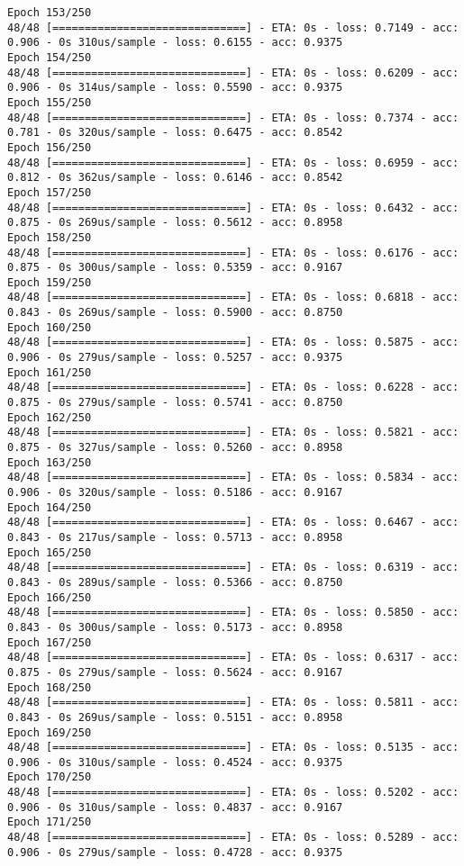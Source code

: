 \documentclass[11pt]{article}
\begin{document}
\begin{Verbatim}[commandchars=\\\{\}]
Epoch 153/250
48/48 [==============================] - ETA: 0s - loss: 0.7149 - acc: 0.906 - 0s 310us/sample - loss: 0.6155 - acc: 0.9375
Epoch 154/250
48/48 [==============================] - ETA: 0s - loss: 0.6209 - acc: 0.906 - 0s 314us/sample - loss: 0.5590 - acc: 0.9375
Epoch 155/250
48/48 [==============================] - ETA: 0s - loss: 0.7374 - acc: 0.781 - 0s 320us/sample - loss: 0.6475 - acc: 0.8542
Epoch 156/250
48/48 [==============================] - ETA: 0s - loss: 0.6959 - acc: 0.812 - 0s 362us/sample - loss: 0.6146 - acc: 0.8542
Epoch 157/250
48/48 [==============================] - ETA: 0s - loss: 0.6432 - acc: 0.875 - 0s 269us/sample - loss: 0.5612 - acc: 0.8958
Epoch 158/250
48/48 [==============================] - ETA: 0s - loss: 0.6176 - acc: 0.875 - 0s 300us/sample - loss: 0.5359 - acc: 0.9167
Epoch 159/250
48/48 [==============================] - ETA: 0s - loss: 0.6818 - acc: 0.843 - 0s 269us/sample - loss: 0.5900 - acc: 0.8750
Epoch 160/250
48/48 [==============================] - ETA: 0s - loss: 0.5875 - acc: 0.906 - 0s 279us/sample - loss: 0.5257 - acc: 0.9375
Epoch 161/250
48/48 [==============================] - ETA: 0s - loss: 0.6228 - acc: 0.875 - 0s 279us/sample - loss: 0.5741 - acc: 0.8750
Epoch 162/250
48/48 [==============================] - ETA: 0s - loss: 0.5821 - acc: 0.875 - 0s 327us/sample - loss: 0.5260 - acc: 0.8958
Epoch 163/250
48/48 [==============================] - ETA: 0s - loss: 0.5834 - acc: 0.906 - 0s 320us/sample - loss: 0.5186 - acc: 0.9167
Epoch 164/250
48/48 [==============================] - ETA: 0s - loss: 0.6467 - acc: 0.843 - 0s 217us/sample - loss: 0.5713 - acc: 0.8958
Epoch 165/250
48/48 [==============================] - ETA: 0s - loss: 0.6319 - acc: 0.843 - 0s 289us/sample - loss: 0.5366 - acc: 0.8750
Epoch 166/250
48/48 [==============================] - ETA: 0s - loss: 0.5850 - acc: 0.843 - 0s 300us/sample - loss: 0.5173 - acc: 0.8958
Epoch 167/250
48/48 [==============================] - ETA: 0s - loss: 0.6317 - acc: 0.875 - 0s 279us/sample - loss: 0.5624 - acc: 0.9167
Epoch 168/250
48/48 [==============================] - ETA: 0s - loss: 0.5811 - acc: 0.843 - 0s 269us/sample - loss: 0.5151 - acc: 0.8958
Epoch 169/250
48/48 [==============================] - ETA: 0s - loss: 0.5135 - acc: 0.906 - 0s 310us/sample - loss: 0.4524 - acc: 0.9375
Epoch 170/250
48/48 [==============================] - ETA: 0s - loss: 0.5202 - acc: 0.906 - 0s 310us/sample - loss: 0.4837 - acc: 0.9167
Epoch 171/250
48/48 [==============================] - ETA: 0s - loss: 0.5289 - acc: 0.906 - 0s 279us/sample - loss: 0.4728 - acc: 0.9375

\end{Verbatim}
\end{document}
